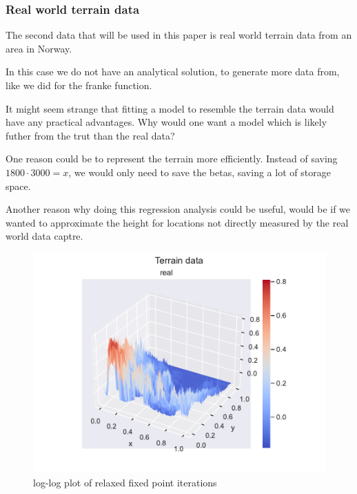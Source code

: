 \documentclass[12pt]{article}
\begin{document}

\subsubsection{Real world terrain data}

The second data that will be used in this paper is real world terrain data from an area in Norway. %

In this case we do not have an analytical solution, to generate more data from, like we did for the franke function.

It might seem strange that fitting a model to resemble the terrain data would have any practical advantages.
Why would one want a model which is likely futher from the trut than the real data?

One reason could be to represent the terrain more efficiently. Instead of saving $1800 \cdot 3000=x$, we would only need to save the betas, saving a lot of storage space.   %

Another reason why doing this regression analysis could be useful, would be if we wanted to approximate the height for locations not directly measured by the real world data captre.


\begin{figure}[H]
    \centering
    \includegraphics[width=\columnwidth]{../src/output/terrain_preview.pdf}
    \caption{log-log plot of relaxed fixed point iterations}
    \label{fig:terrain_function}
\end{figure}
\end{document}
